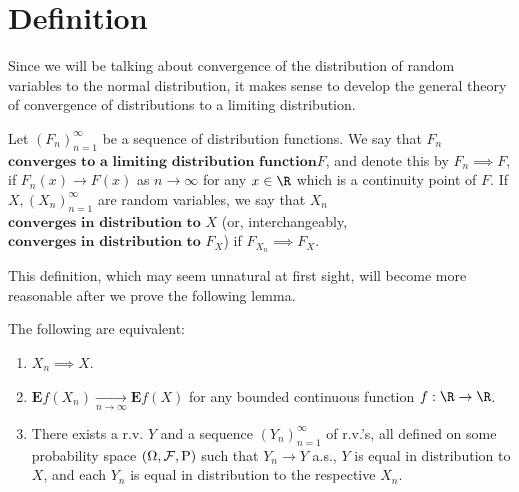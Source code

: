 \section{Definition}

Since we will be talking about convergence of the
distribution of random variables to the normal
distribution, it makes sense to develop the general
theory of convergence of distributions to a limiting
distribution.

\begin{defn}
Let $(F_n)_{n=1}^\infty$ be a sequence of
distribution functions. We say that $F_n$$\textbf{converges to a limiting distribution
function}$$F$, and denote this by $F_n \implies F$, if
$F_n(x)\to F(x)$ as $n\to\infty$ for any $x\in\R$
which is a continuity point of $F$. If
$X, (X_n)_{n=1}^\infty$ are random variables, we say
that $X_n$$\textbf{converges in distribution to } X$
(or, interchangeably,
$\textbf{converges in distribution to } F_X$) if
$F_{X_n}\implies F_X$.
\end{defn}

\noindent This definition, which may seem unnatural at first
sight, will become more reasonable after we prove the
following lemma.

\begin{lem}
The following are equivalent:

\begin{enumerate}[label=\arabic*.]
\item $X_n \implies X$.

\item $\mathbf{E} f(X_n) \xrightarrow[n\to\infty]{}
\mathbf{E} f(X)$
for any bounded continuous function $f:\R\to\R$.

\item There exists a r.v. $Y$ and a sequence
$(Y_n)_{n=1}^\infty$ of r.v.'s, all defined on some
probability space $(\Omega, {\cal F}, \mathrm{P})$
such that $Y_n \to Y$ a.s., $Y$ is equal in
distribution to $X$, and each $Y_n$ is equal in
distribution to the respective $X_n$.
\end{enumerate}

\end{lem}

